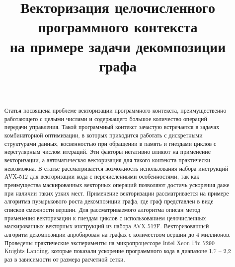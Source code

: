 \documentclass[
11pt,%
tightenlines,%
twoside,%
onecolumn,%
nofloats,%
nobibnotes,%
nofootinbib,%
superscriptaddress,%
noshowpacs,%
centertags]%
{revtex4}
\begin{document}

\title{Векторизация целочисленного программного контекста \\ на примере задачи декомпозиции графа}

\author{~}




\begin{abstract} %
Статья посвящена проблеме векторизации программного контекста, преимущественно работающего с целыми числами и содержащего большое количество операций передачи управления.
Такой программный контекст зачастую встречается в задачах комбинаторной оптимизации, в которых приходится работать с дискретными структурами данных, косвенностью при обращении в память и гнездами циклов с нерегулярным числом итераций.
Эти факторы негативно влияют на применение векторизации, а автоматическая векторизация для такого контекста практически невозможна.
В статье рассматривается возможность использования набора инструкций AVX-512 для векторизации кода с перечисленными особенностями, так как преимущества маскированных векторных операций позволяют достичь ускорения даже при наличии таких узких мест.
Применение векторизации рассматривается на примере алгоритма пузырькового роста декомпозиции графа, где граф представлен в виде списков смежности вершин.
Для рассматриваемого алгоритма описан метод применения векторизации к гнездам циклов с использованием целочисленных маскированных векторных инструкций из набора AVX-512F.
Векторизованный алгоритм декомпозиции апробирован на графах с количеством вершин до 4 миллионов.
Проведены практические эксперименты на микропроцессоре Intel Xeon Phi 7290 Knights Landing, которые показали ускорение программного кода в диапазоне 1,7 -- 2,2 раз в зависимости от размера расчетной сетки.
\end{abstract}
\end{document}
